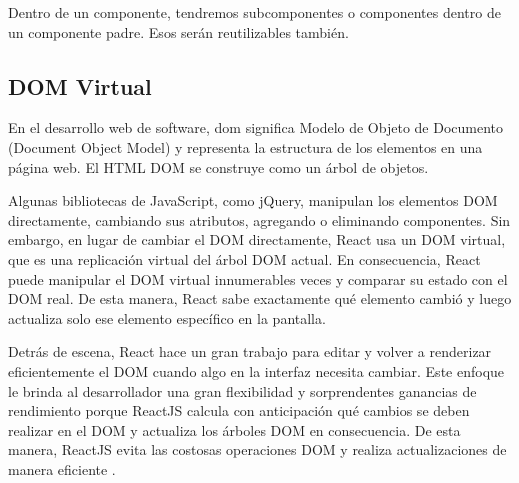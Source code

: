 Dentro de un componente, tendremos subcomponentes o componentes dentro de un componente padre. Esos serán reutilizables también.
\vspace{0.8cm}




\subsection{DOM Virtual}
En el desarrollo web de software, \acrshort{dom} significa Modelo de Objeto de Documento (Document Object Model) y representa la estructura de los elementos en una página web. El HTML DOM se construye como un árbol de objetos.

Algunas bibliotecas de JavaScript, como jQuery, manipulan los elementos DOM directamente, cambiando sus atributos, agregando o eliminando componentes. Sin embargo, en lugar de cambiar el DOM directamente, React usa un DOM virtual, que es una replicación virtual del árbol DOM actual. En consecuencia, React puede manipular el DOM virtual innumerables veces y comparar su estado con el DOM real. De esta manera, React sabe exactamente qué elemento cambió y luego actualiza solo ese elemento específico en la pantalla.

Detrás de escena, React hace un gran trabajo para editar y volver a \gls{renderizar} eficientemente el DOM cuando algo en la interfaz necesita cambiar. Este enfoque le brinda al desarrollador una gran flexibilidad y sorprendentes ganancias de rendimiento porque ReactJS calcula con anticipación qué cambios se deben realizar en el DOM y actualiza los árboles DOM en consecuencia. De esta manera, ReactJS evita las costosas operaciones DOM y realiza actualizaciones de manera eficiente \cite{stefanov}.